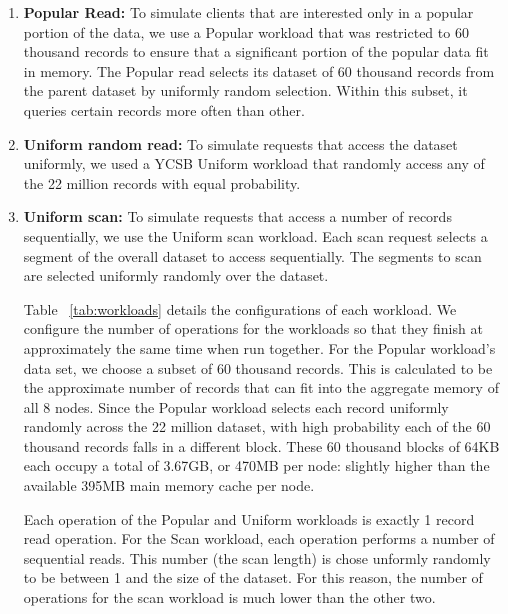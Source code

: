 \documentclass[twocolumn]{article}
\begin{document}
\begin{enumerate}
\item \textbf{Popular Read:}  
To simulate clients that are interested only in a popular portion of the data, we use a Popular workload that was restricted to 60 thousand records to ensure that a significant portion of the popular data fit in memory. The Popular read selects its dataset of 60 thousand records from the parent dataset by uniformly random selection. Within this subset, it queries certain records more often than other. 


\item \textbf{Uniform random read:} To simulate requests that access the dataset uniformly, we used a YCSB Uniform workload that randomly access any of the 22 million records with equal probability.

\item \textbf{Uniform scan:} To simulate requests that access a number of records sequentially, we use the Uniform scan workload. Each scan request selects a segment of the overall dataset to access sequentially. The segments to scan are selected uniformly randomly over the dataset.

Table ~\ref{tab:workloads} details the configurations of each workload. We configure the number of operations for the workloads so that they finish at approximately the same time when run together. For the Popular workload's data set, we choose a subset of 60 thousand records. This is calculated to be the approximate number of records that can fit into the aggregate memory of all 8 nodes. Since the Popular workload selects each record uniformly randomly across the 22 million dataset, with high probability each of the 60 thousand records falls in a different block. These 60 thousand blocks of 64KB each occupy a total of 3.67GB, or 470MB per node: slightly higher than the available 395MB main memory cache per node.

Each operation of the Popular and Uniform workloads is exactly 1 record read operation.
For the Scan workload, each operation performs a number of sequential reads. This number (the scan length) is chose unformly randomly to be between 1 and the size of the dataset. For this reason, the number of operations for the scan workload is much lower than the other two.


\end{enumerate}
\end{document}
